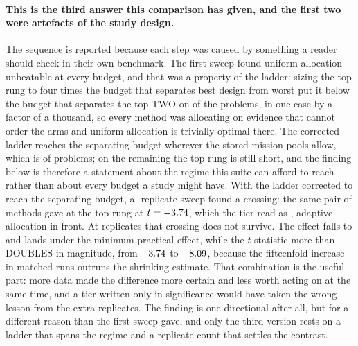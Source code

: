 \documentclass[11pt]{article}
\begin{document}
\paragraph{This is the third answer this comparison has given, and the first two were artefacts of
the study design.} The sequence is reported because each step was caused by something a reader
should check in their own benchmark. The first sweep found uniform allocation unbeatable at every
budget, and that was a property of the ladder: sizing the top rung to four times the budget that
separates best design from worst put it below the budget that separates the top TWO on
\RsOldLadderShort{} of the \RsOldLadderHave{} problems, in one case by a factor of a thousand, so
every method was allocating on evidence that cannot order the arms and uniform allocation is
trivially optimal there. The corrected ladder reaches the separating budget wherever the stored
mission pools allow, which is \RsReachSep{} of \RsLadderHave{} problems; on the remaining
\RsLadderShort{} the top rung is still short, and the finding below is therefore a statement about
the regime this suite can afford to reach rather than about every budget a study might have. With the ladder corrected to reach the separating budget, a
\RsPrevReplicates{}-replicate sweep found a crossing: the same pair of methods gave
\RsPrevCrossTopEff{} at the top rung at $t = -3.74{}$, which the tier read as
\RsPrevCrossTopVerdict{}, adaptive allocation in front. At \RsReplicates{} replicates that crossing
does not survive. The effect falls to \RsCrossTopEff{} and lands under the minimum practical
effect, while the $t$ statistic more than DOUBLES in magnitude, from
$-3.74{}$ to $-8.09{}$, because the fifteenfold increase in matched runs outruns
the shrinking estimate. That combination is the useful part: more
data made the difference more certain and less worth acting on at the same time, and a tier written
only in significance would have taken the wrong lesson from the extra replicates. The finding is
one-directional after all, but for a different reason than the first sweep gave, and only the third
version rests on a ladder that spans the regime and a replicate count that settles the contrast.
\end{document}
